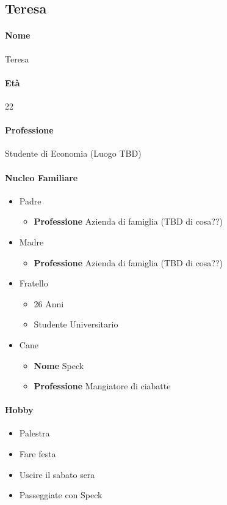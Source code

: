 \documentclass[../../UUX_Personas.tex]{subfiles}
\begin{document}
	\subsection{Teresa}
	\paragraph{Nome} Teresa
	\paragraph{Età} 22
	\paragraph{Professione} Studente di Economia (Luogo TBD)
	\paragraph{Nucleo Familiare}
	\begin{itemize}
		\item Padre
		\begin{itemize} 
			\item \textbf{Professione} Azienda di famiglia (TBD di cosa??) 
		\end{itemize}
		\item Madre
		\begin{itemize}
			\item \textbf{Professione} Azienda di famiglia (TBD di cosa??)  
		\end{itemize}
		\item Fratello
		\begin{itemize}
			\item 26 Anni
			\item Studente Universitario
		\end{itemize}
		\item Cane
		\begin{itemize}
			\item \textbf{Nome} Speck
			\item \textbf{Professione} Mangiatore di ciabatte 
		\end{itemize}
	\end{itemize}
	\paragraph{Hobby}
	\begin{itemize}
		\begin{itemize}
			\item Palestra
			\item Fare festa
			\item Uscire il sabato sera
			\item Passeggiate con Speck
		\end{itemize}
	\end{itemize}
\end{document}
